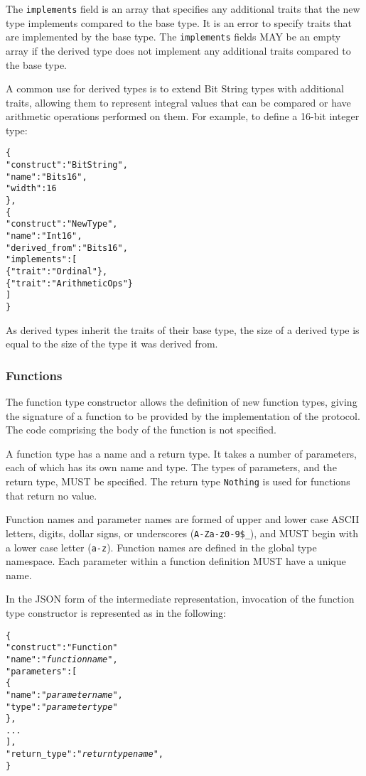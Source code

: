 \documentclass[10pt,twocolumn,a4paper]{article}
\newcommand{\code}[1]{\texttt{#1}}
\begin{document}
The \code{implements} field is an array that specifies any additional
traits that the new type implements compared to the base type. It is an
error to specify traits that are implemented by the base type.
The \code{implements} fields MAY be an empty array if the derived type
does not implement any additional traits compared to the base type.

A common use for derived types is to extend Bit String types with additional
traits, allowing them to represent integral values that can be compared or
have arithmetic operations performed on them. For example, to define a 16-bit
integer type:
\footnotesize
\begin{alltt}
  \{
    "construct"     : "BitString",
    "name"          : "Bits16",
    "width"         : 16
  \},
  \{
    "construct"     : "NewType",
    "name"          : "Int16",
    "derived\_from"  : "Bits16",
    "implements"    : [
      \{"trait" : "Ordinal"\},
      \{"trait" : "ArithmeticOps"\}
    ]
  \}
\end{alltt}
\normalsize

As derived types inherit the traits of their base type, the size of a derived type is
equal to the size of the type it was derived from.

\subsubsection{Functions}
\label{sec:functions}

The function type constructor allows the definition of new function types,
giving the signature of a function to be provided by the implementation of
the protocol. The code comprising the body of the function is not specified. 

A function type has a name and a return type. It takes a number of
parameters, each of which has its own name and type. 
The types of parameters, and the return type, MUST be specified.
The return type \code{Nothing} is used for functions that return no value.

Function names and parameter names are formed of upper and lower case ASCII
letters, digits, dollar signs, or underscores (\code{A-Za-z0-9\$\_}), and
MUST begin with a lower case letter (\code{a-z}).
Function names are defined in the global type namespace.
Each parameter within a function definition MUST have a unique name.

In the JSON form of the intermediate representation, invocation of the
function type constructor is represented as in the following:
\footnotesize
\begin{alltt}
  \{
    "construct"    : "Function"
    "name"         : "\emph{function name}",
    "parameters"   : [
      \{
        "name" : "\emph{parameter name}",
        "type" : "\emph{parameter type}"
      \},
      ...
    ],
    "return\_type"  : "\emph{return type name}",
  \}
\end{alltt}
\normalsize
\end{document}
